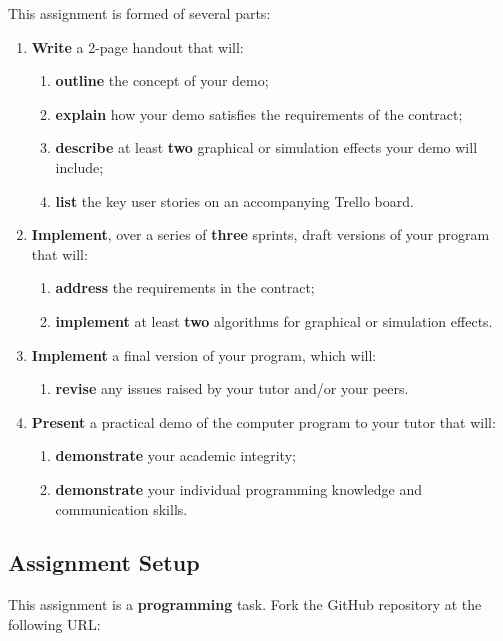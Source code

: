 \documentclass{../fal_assignment}
\begin{document}
This assignment is formed of several parts:
\begin{enumerate}[label=(\Alph*)]
	\item \textbf{Write} a 2-page handout that will:
		\begin{enumerate}[label=(\roman*)]
			\item \textbf{outline} the concept of your demo;
			\item \textbf{explain} how your demo satisfies the requirements of the contract;
			\item \textbf{describe} at least \textbf{two} graphical or simulation effects your demo will include;
			\item \textbf{list} the key user stories on an accompanying Trello board.
		\end{enumerate}
	\item \textbf{Implement}, over a series of \textbf{three} sprints, draft versions of your program that will:
		\begin{enumerate}[label=(\roman*)]
			\item \textbf{address} the requirements in the contract;
			\item \textbf{implement} at least \textbf{two} algorithms for graphical or simulation effects.
		\end{enumerate}
	\item \textbf{Implement} a final version of your program, which will:
		\begin{enumerate}[label=(\roman*)]
			\item \textbf{revise} any issues raised by your tutor and/or your peers.
		\end{enumerate}
	\item \textbf{Present} a practical demo of the computer program to your tutor that will:
		\begin{enumerate}[label=(\roman*)]
			\item \textbf{demonstrate} your academic integrity;
			\item \textbf{demonstrate} your individual programming knowledge and communication skills.
		\end{enumerate}
\end{enumerate}

\subsection*{Assignment Setup}

This assignment is a \textbf{programming} task. Fork the GitHub repository at the following URL:
\end{document}
